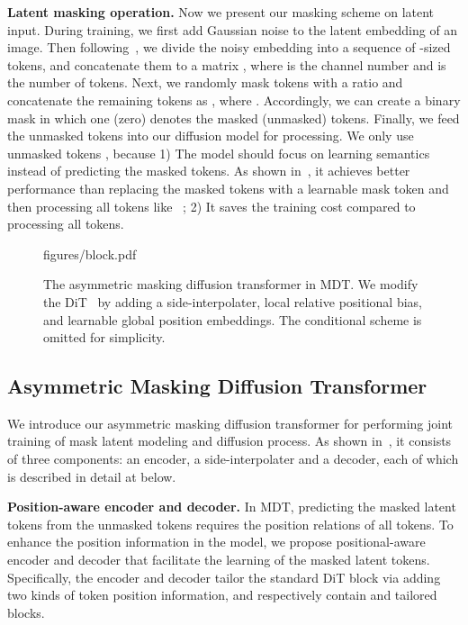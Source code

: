 \documentclass[final]{cvpr}
\newcommand{\myPara}[1]{\vspace{.08in} \noindent\textbf{#1}}
\begin{document}
\myPara{Latent  masking operation.} Now we present our masking scheme on latent input.  
During training, we first add Gaussian noise to the latent embedding  of an image. 
Then following~\cite{peebles2022scalable}, we divide the noisy embedding  into 
a sequence of -sized tokens, 
and concatenate them to a matrix , 
where  is the channel number and  is the number of tokens.  
Next, we randomly mask tokens with a  ratio 
and concatenate the remaining tokens as  ,
where .  
Accordingly, we can create a binary mask   in which one (zero) denotes the masked (unmasked) tokens.   
Finally, we feed the  unmasked tokens  into our diffusion model for processing.  
We only use unmasked tokens , 
because 1)
The model should focus on learning semantics
 instead of predicting the masked tokens.
As shown in~, it achieves better performance than
replacing the masked tokens with a learnable mask token 
and then processing all tokens like~\cite{bao2021beit,chang2022maskgit,chang2023muse} ; 
2) It saves the training cost compared to processing all  tokens.  

\begin{figure}[!t]
	\centering
	\begin{overpic}[width=1\linewidth]{figures/block.pdf}
	\end{overpic}
	\caption{The asymmetric masking diffusion transformer in MDT.
	We modify the DiT~\cite{peebles2022scalable} by adding a side-interpolater, local relative positional bias, and learnable global position embeddings.
	The conditional scheme is omitted for simplicity.
	}\label{fig:block}
\end{figure}

\subsection{Asymmetric Masking Diffusion Transformer}
We introduce our asymmetric masking diffusion transformer for performing joint training of mask latent modeling and diffusion process. 
As shown in~, it consists of three components: an encoder, a side-interpolater and a decoder, each of which is described in detail at below. 



\myPara{Position-aware encoder and decoder.} 
In MDT, predicting the masked latent tokens  from the unmasked tokens 
requires the position relations of all tokens.
To enhance the position information in the model, we propose positional-aware encoder and decoder that 
facilitate the learning of the masked latent tokens.  
Specifically, the encoder and decoder tailor the standard DiT block via adding two kinds of token position information, and respectively contain  and  tailored blocks. 
\end{document}
